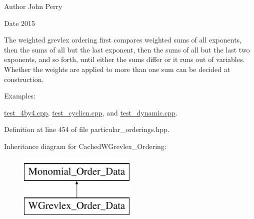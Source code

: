 \begin{DoxyAuthor}{Author}
John Perry 
\end{DoxyAuthor}
\begin{DoxyDate}{Date}
2015
\end{DoxyDate}
The weighted grevlex ordering first compares weighted sums of all exponents, then the sums of all but the last exponent, then the sums of all but the last two exponents, and so forth, until either the sums differ or it runs out of variables. Whether the weights are applied to more than one sum can be decided at construction. \begin{Desc}
\item[Examples\+: ]\par
\hyperlink{test_4by4_8cpp-example}{test\+\_\+4by4.\+cpp}, \hyperlink{test_cyclicn_8cpp-example}{test\+\_\+cyclicn.\+cpp}, and \hyperlink{test_dynamic_8cpp-example}{test\+\_\+dynamic.\+cpp}.\end{Desc}


Definition at line 454 of file particular\+\_\+orderings.\+hpp.

Inheritance diagram for Cached\+W\+Grevlex\+\_\+\+Ordering\+:\begin{figure}[H]
\begin{center}
\leavevmode
\includegraphics[height=3.000000cm]{group__orderinggroup}
\end{center}
\end{figure}
